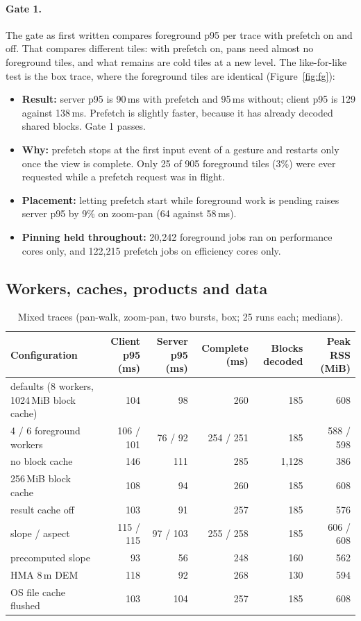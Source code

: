 \documentclass[11pt,a4paper]{article}
\begin{document}
\paragraph{Gate 1.} The gate as first written compares foreground p95 per trace with prefetch on and off. That
compares different tiles: with prefetch on, pans need almost no foreground tiles, and what remains are cold tiles at a
new level. The like-for-like test is the box trace, where the foreground tiles are identical (Figure~\ref{fig:fg}):
\begin{itemize}
  \item \textbf{Result:} server p95 is 90\,ms with prefetch and 95\,ms without; client p95 is 129 against 138\,ms.
  Prefetch is slightly faster, because it has already decoded shared blocks. Gate 1 passes.
  \item \textbf{Why:} prefetch stops at the first input event of a gesture and restarts only once the view is
  complete. Only 25 of 905 foreground tiles (3\%) were ever requested while a prefetch request was in flight.
  \item \textbf{Placement:} letting prefetch start while foreground work is pending raises server p95 by 9\% on
  zoom-pan (64 against 58\,ms).
  \item \textbf{Pinning held throughout:} 20{,}242 foreground jobs ran on performance cores only, and 122{,}215
  prefetch jobs on efficiency cores only.
\end{itemize}

\subsection{Workers, caches, products and data}
\begin{table}[!htbp]
\centering\small
\caption{Mixed traces (pan-walk, zoom-pan, two bursts, box; 25 runs each; medians).}
\label{tab:mixed}
\begin{tabularx}{\linewidth}{lRRRRR}
\toprule
Configuration & Client p95 (ms) & Server p95 (ms) & Complete (ms) & Blocks decoded & Peak RSS (MiB) \\
\midrule
defaults (8 workers, 1024\,MiB block cache) & 104 & 98 & 260 & 185 & 608 \\
4 / 6 foreground workers & 106 / 101 & 76 / 92 & 254 / 251 & 185 & 588 / 598 \\
no block cache & 146 & 111 & 285 & 1{,}128 & 386 \\
256\,MiB block cache & 108 & 94 & 260 & 185 & 608 \\
result cache off & 103 & 91 & 257 & 185 & 576 \\
slope / aspect & 115 / 115 & 97 / 103 & 255 / 258 & 185 & 606 / 608 \\
precomputed slope & 93 & 56 & 248 & 160 & 562 \\
HMA 8\,m DEM & 118 & 92 & 268 & 130 & 594 \\
OS file cache flushed & 103 & 104 & 257 & 185 & 608 \\
\bottomrule
\end{tabularx}
\end{table}
\end{document}
